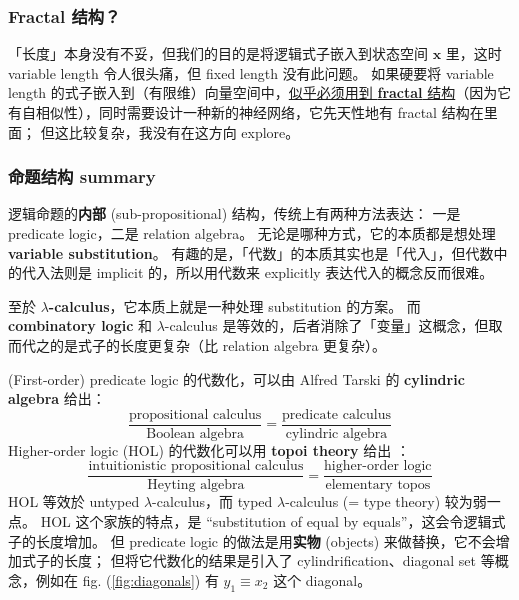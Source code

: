 \documentclass[orivec]{llncs}
\newcommand{\emp}[1]{\textbf{#1}}
\newcommand{\vect}[1]{\boldsymbol{#1}}
\begin{document}
\subsubsection{Fractal 结构？}

「长度」本身没有不妥，但我们的目的是将逻辑式子嵌入到状态空间 $\vect{x}$ 里，这时 variable length 令人很头痛，但 fixed length 没有此问题。 如果硬要将 variable length 的式子嵌入到（有限维）向量空间中，\uline{似乎必须用到 \emp{fractal} 结构}（因为它有自相似性），同时需要设计一种新的神经网络，它先天性地有 fractal 结构在里面； 但这比较复杂，我没有在这方向 explore。

\subsubsection{命题结构 summary}

逻辑命题的\textbf{内部} (sub-propositional) 结构，传统上有两种方法表达： 一是 predicate logic，二是 relation algebra。 无论是哪种方式，它的本质都是想处理 \emp{variable substitution}。 有趣的是，「代数」的本质其实也是「代入」，但代数中的代入法则是 implicit 的，所以用代数来 explicitly 表达代入的概念反而很难。

至於 \emp{$\lambda$-calculus}，它本质上就是一种处理 substitution 的方案。 而 \emp{combinatory logic} 和 $\lambda$-calculus 是等效的，后者消除了「变量」这概念，但取而代之的是式子的长度更复杂（比 relation algebra 更复杂）。

(First-order) predicate logic 的代数化，可以由 Alfred Tarski 的 \emp{cylindric algebra} 给出：
\begin{equation}
\frac{\mbox{propositional calculus}}{\mbox{Boolean algebra}} = \frac{\mbox{predicate calculus}}{\mbox{cylindric algebra}}
\end{equation}
Higher-order logic (HOL) 的代数化可以用 \emp{topoi theory} 给出 \cite{Lambek1988} \cite{MacLane1992}：
\begin{equation}
\frac{\mbox{intuitionistic propositional calculus}}{\mbox{Heyting algebra}} = \frac{\mbox{higher-order logic}}{\mbox{elementary topos}}
\end{equation}
HOL 等效於 untyped $\lambda$-calculus，而 typed $\lambda$-calculus (= type theory) 较为弱一点。  HOL 这个家族的特点，是 ``substitution of equal by equals''，这会令逻辑式子的长度增加。 但 predicate logic 的做法是用\textbf{实物} (objects) 来做替换，它不会增加式子的长度； 但将它代数化的结果是引入了 cylindrification、diagonal set 等概念，例如在 fig. (\ref{fig:diagonals}) 有 $y_1 \equiv x_2$ 这个 diagonal。
\end{document}
